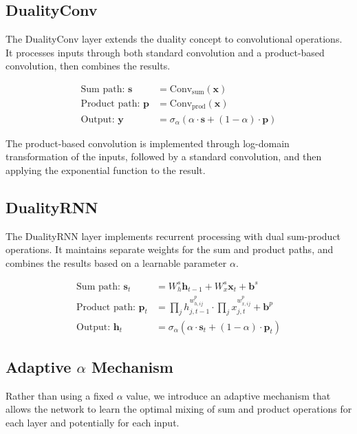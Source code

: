 \documentclass{article}
\begin{document}
\subsection{DualityConv}

The DualityConv layer extends the duality concept to convolutional operations. It processes inputs through both standard convolution and a product-based convolution, then combines the results.

\begin{align}
\text{Sum path: } \mathbf{s} &= \text{Conv}_{\text{sum}}(\mathbf{x}) \\
\text{Product path: } \mathbf{p} &= \text{Conv}_{\text{prod}}(\mathbf{x}) \\
\text{Output: } \mathbf{y} &= \sigma_\alpha(\alpha \cdot \mathbf{s} + (1-\alpha) \cdot \mathbf{p})
\end{align}

The product-based convolution is implemented through log-domain transformation of the inputs, followed by a standard convolution, and then applying the exponential function to the result.

\subsection{DualityRNN}

The DualityRNN layer implements recurrent processing with dual sum-product operations. It maintains separate weights for the sum and product paths, and combines the results based on a learnable parameter $\alpha$.

\begin{align}
\text{Sum path: } \mathbf{s}_t &= W_h^s\mathbf{h}_{t-1} + W_x^s\mathbf{x}_t + \mathbf{b}^s \\
\text{Product path: } \mathbf{p}_t &= \prod_j h_{j,t-1}^{w_{h,ij}^p} \cdot \prod_j x_{j,t}^{w_{x,ij}^p} + \mathbf{b}^p \\
\text{Output: } \mathbf{h}_t &= \sigma_\alpha(\alpha \cdot \mathbf{s}_t + (1-\alpha) \cdot \mathbf{p}_t)
\end{align}

\subsection{Adaptive $\alpha$ Mechanism}

Rather than using a fixed $\alpha$ value, we introduce an adaptive mechanism that allows the network to learn the optimal mixing of sum and product operations for each layer and potentially for each input.
\end{document}
